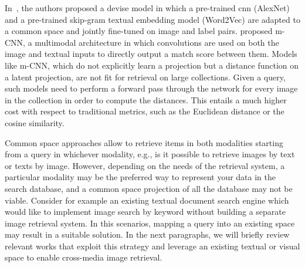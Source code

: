 In~\cite{frome2013devise}, the authors proposed a \gls{devise} model in which a pre-trained \gls{cnn} (AlexNet) and a pre-trained skip-gram textual embedding model (Word2Vec) are adapted to a common space and jointly fine-tuned on image and label pairs.
\citet{ma2015multimodal} proposed m-CNN, a multimodal architecture in which convolutions are used on both the image and textual inputs to directly output a match score between them.
Models like m-CNN, which do not explicitly learn a projection but a distance function on a latent projection, are not fit for retrieval on large collections.
Given a query, such models need to perform a forward pass through the network for every image in the collection in order to compute the distances.
This entails a much higher cost with respect to traditional metrics, such as the Euclidean distance or the cosine similarity.

Common space approaches allow to retrieve items in both modalities starting from a query in whichever modality, e.g., is it possible to retrieve images by text or texts by image.
However, depending on the needs of the retrieval system, a particular modality may be the preferred way to represent your data in the search database, and a common space projection of all the database may not be viable.
Consider for example an existing textual document search engine which would like to implement image search by keyword without building a separate image retrieval system.
In this scenarios, mapping a query into an existing space may result in a suitable solution.
In the next paragraphs, we will briefly review relevant works that exploit this strategy and leverage an existing textual or visual space to enable cross-media image retrieval.

